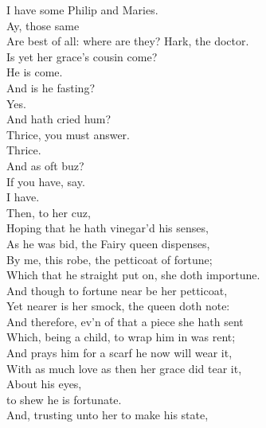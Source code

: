 \documentclass[a4paper,oneside]{memoir}
\begin{document}
\begin{drama*}
\dapperspeaks I have some Philip and Maries.\\
\facespeaks {} Ay, those same\\
Are best of all: where are they? Hark, the doctor.\\
\subtlespeaks {} Is yet her grace's cousin come?\\
\facespeaks {} He is come.\\
\subtlespeaks And is he fasting?\\
\facespeaks {} Yes.\\
\subtlespeaks {} And hath cried hum?\\
\facespeaks Thrice, you must answer.\\
\dapperspeaks {} Thrice.\\
\subtlespeaks {} And as oft buz?\\
\facespeaks If you have, say.\\
\dapperspeaks {} I have.\\
\subtlespeaks {} Then, to her cuz,\\
Hoping that he hath vinegar'd his senses,\\
As he was bid, the Fairy queen dispenses,\\
By me, this robe, the petticoat of fortune;\\
Which that he straight put on, she doth importune.\\
And though to fortune near be her petticoat,\\
Yet nearer is her smock, the queen doth note:\\
And therefore, ev'n of that a piece she hath sent\\
Which, being a child, to wrap him in was rent;\\
And prays him for a scarf he now will wear it,\\
With as much love as then her grace did tear it,\\
About his eyes,\\
 to shew he is fortunate.\\
And, trusting unto her to make his state,\\

\end{drama*}
\end{document}
